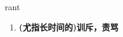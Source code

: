 
\begin{frame}
{\huge rant}
\begin{center}
\begin{enumerate}\Large
  \item \textbf{(尤指长时间的)训斥，责骂}
\end{enumerate}
\end{center}
\end{frame}
